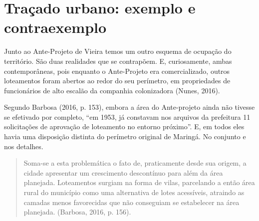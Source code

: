 \documentclass[12pt, a4paper]{book} %
\begin{document}
            


        \chapter[Traçado urbano: exemplo e contraexemplo]{Traçado urbano: exemplo e contraexemplo}

        Junto ao Ante-Projeto de Vieira temos um outro esquema de ocupação do território. São duas realidades que se contrapõem. E, curiosamente, ambas contemporâneas, pois enquanto o Ante-Projeto era comercializado, outros loteamentos foram abertos ao redor do seu perímetro, em propriedades de funcionários de alto escalão da companhia colonizadora (Nunes, 2016).

        Segundo Barbosa (2016, p. 153), embora a área do Ante-projeto ainda não tivesse se efetivado por completo, ``em 1953, já constavam nos arquivos da prefeitura 11 solicitações de aprovação de loteamento no entorno próximo''. E, em todos eles havia uma disposição distinta do perímetro original de Maringá. No conjunto e nos detalhes.

        \begin{quotation}
            Soma-se a esta problemática o fato de, praticamente desde sua origem, a cidade apresentar um crescimento descontínuo para além da área planejada. Loteamentos surgiam na forma de vilas, parcelando a então área rural do município como uma alternativa de lotes acessíveis, atraindo as camadas menos favorecidas que não conseguiam se estabelecer na área planejada. (Barbosa, 2016, p. 156).
        \end{quotation}
\end{document}
